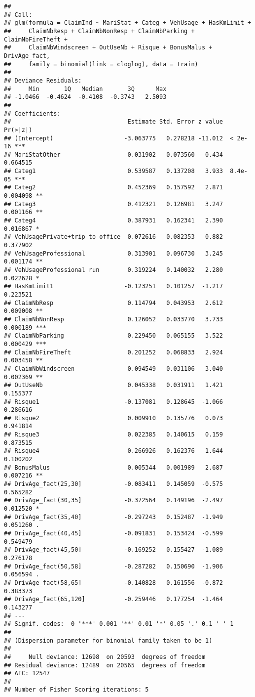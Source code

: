 \documentclass[
]{article}
\begin{document}
\begin{verbatim}
## 
## Call:
## glm(formula = ClaimInd ~ MariStat + Categ + VehUsage + HasKmLimit + 
##     ClaimNbResp + ClaimNbNonResp + ClaimNbParking + ClaimNbFireTheft + 
##     ClaimNbWindscreen + OutUseNb + Risque + BonusMalus + DrivAge_fact, 
##     family = binomial(link = cloglog), data = train)
## 
## Deviance Residuals: 
##     Min       1Q   Median       3Q      Max  
## -1.0466  -0.4624  -0.4108  -0.3743   2.5093  
## 
## Coefficients:
##                                 Estimate Std. Error z value Pr(>|z|)    
## (Intercept)                    -3.063775   0.278218 -11.012  < 2e-16 ***
## MariStatOther                   0.031902   0.073560   0.434 0.664515    
## Categ1                          0.539587   0.137208   3.933  8.4e-05 ***
## Categ2                          0.452369   0.157592   2.871 0.004098 ** 
## Categ3                          0.412321   0.126981   3.247 0.001166 ** 
## Categ4                          0.387931   0.162341   2.390 0.016867 *  
## VehUsagePrivate+trip to office  0.072616   0.082353   0.882 0.377902    
## VehUsageProfessional            0.313901   0.096730   3.245 0.001174 ** 
## VehUsageProfessional run        0.319224   0.140032   2.280 0.022628 *  
## HasKmLimit1                    -0.123251   0.101257  -1.217 0.223521    
## ClaimNbResp                     0.114794   0.043953   2.612 0.009008 ** 
## ClaimNbNonResp                  0.126052   0.033770   3.733 0.000189 ***
## ClaimNbParking                  0.229450   0.065155   3.522 0.000429 ***
## ClaimNbFireTheft                0.201252   0.068833   2.924 0.003458 ** 
## ClaimNbWindscreen               0.094549   0.031106   3.040 0.002369 ** 
## OutUseNb                        0.045338   0.031911   1.421 0.155377    
## Risque1                        -0.137081   0.128645  -1.066 0.286616    
## Risque2                         0.009910   0.135776   0.073 0.941814    
## Risque3                         0.022385   0.140615   0.159 0.873515    
## Risque4                         0.266926   0.162376   1.644 0.100202    
## BonusMalus                      0.005344   0.001989   2.687 0.007216 ** 
## DrivAge_fact(25,30]            -0.083411   0.145059  -0.575 0.565282    
## DrivAge_fact(30,35]            -0.372564   0.149196  -2.497 0.012520 *  
## DrivAge_fact(35,40]            -0.297243   0.152487  -1.949 0.051260 .  
## DrivAge_fact(40,45]            -0.091831   0.153424  -0.599 0.549479    
## DrivAge_fact(45,50]            -0.169252   0.155427  -1.089 0.276178    
## DrivAge_fact(50,58]            -0.287282   0.150690  -1.906 0.056594 .  
## DrivAge_fact(58,65]            -0.140828   0.161556  -0.872 0.383373    
## DrivAge_fact(65,120]           -0.259446   0.177254  -1.464 0.143277    
## ---
## Signif. codes:  0 '***' 0.001 '**' 0.01 '*' 0.05 '.' 0.1 ' ' 1
## 
## (Dispersion parameter for binomial family taken to be 1)
## 
##     Null deviance: 12698  on 20593  degrees of freedom
## Residual deviance: 12489  on 20565  degrees of freedom
## AIC: 12547
## 
## Number of Fisher Scoring iterations: 5
\end{verbatim}
\end{document}
